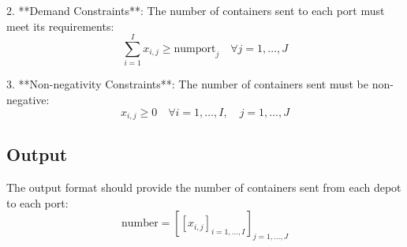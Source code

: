 \documentclass{article}
\begin{document}
2. **Demand Constraints**: The number of containers sent to each port must meet its requirements:
\[
\sum_{i=1}^{I} x_{i,j} \geq \text{numport}_{j} \quad \forall j = 1, \ldots, J
\]

3. **Non-negativity Constraints**: The number of containers sent must be non-negative:
\[
x_{i,j} \geq 0 \quad \forall i = 1, \ldots, I, \quad j = 1, \ldots, J
\]

\subsection*{Output}
The output format should provide the number of containers sent from each depot to each port:
\[
\text{number} = \left[ \left[ x_{i,j} \right]_{i=1,\ldots,I} \right]_{j=1,\ldots,J}
\]
\end{document}

